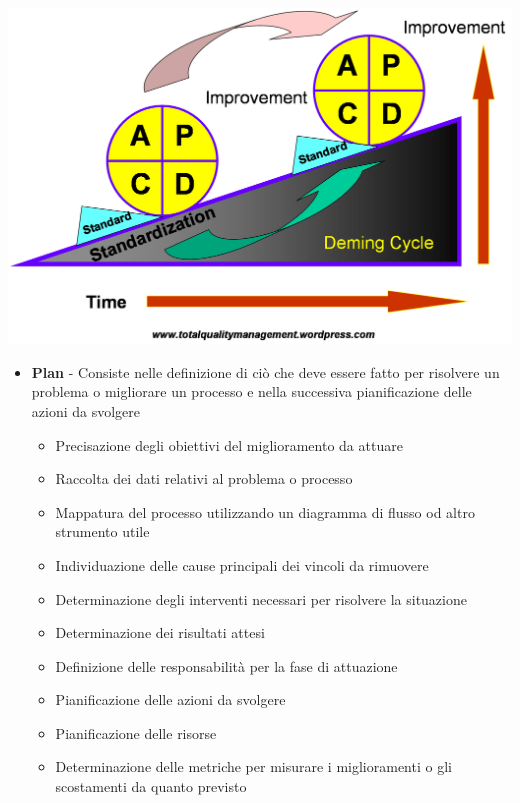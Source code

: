 {%
   \begin{center}
   \includegraphics[scale=0.3]{img/deming.png}
\end{center}



\begin{itemize}
  \item  \textbf{Plan} - Consiste nelle definizione di ciò che deve essere fatto per risolvere un problema o migliorare un processo e nella successiva pianificazione delle azioni da svolgere\\
  \begin{itemize}
    \item Precisazione degli obiettivi del miglioramento da attuare
    \item Raccolta dei dati relativi al problema o processo
    \item Mappatura del processo utilizzando un diagramma di flusso od altro strumento utile
    \item Individuazione delle cause principali dei vincoli da rimuovere
    \item Determinazione degli interventi necessari per risolvere la situazione
    \item Determinazione dei risultati attesi
    \item Definizione delle responsabilità per la fase di attuazione
    \item Pianificazione delle azioni da svolgere
    \item Pianificazione delle risorse
    \item Determinazione delle metriche per misurare i miglioramenti o gli scostamenti da quanto previsto
  \end{itemize}


\end{itemize}}
